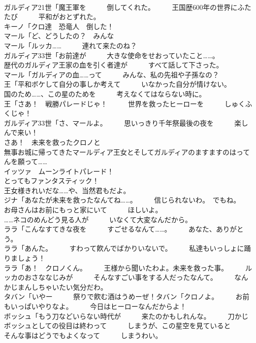 \documentclass[8pt]{extreport}
\begin{document}
\begin{CJK}{UTF8}{min}
\\	ガルディア21世「魔王軍を　　　倒してくれた。　　　王国歴600年の世界にふたたび　　　平和がおとずれた。	
\\	キーノ「クロ達　恐竜人　倒した！	
\\	マール「ど、どうしたの？　みんな	
\\	マール「ルッカ……　　　連れて来たのね？	
\\	ガルディア33世「お前達が　　　大きな使命をせおっていたこと……。	
\\	歴代のガルディア王家の血を引く者達が　　　すべて話して下さった。	
\\	マール「ガルディアの血……って　　　みんな、私の先祖や子孫なの？	
\\	王「平和ボケして自分の事しか考えて　　　いなかった自分が情けない。　　　国のため……、この星のためを　　　考えなくてはならない時に。	
\\	王「さあ！　戦勝パレードじゃ！　　　世界を救ったヒーローを　　　しゅくふくじゃ！	
\\	ガルディア33世「さ、マールよ。　　　思いっきり千年祭最後の夜を　　　楽しんで来い！	
\\	さあ！　未来を救ったクロノと	
\\	無事お城に帰ってきたマールディア王女とそしてガルディアのますますのはってんを願って……	
\\	イッツァ　ムーンライトパレード！	
\\	とってもファンタスティック！	
\\	王女様きれいだな……や、当然君もだよ。	
\\	ジナ「あなたが未来を救ったなんてね……。　　　信じられないわ。　でもね。　　　お母さんはお前にもっと家にいて　　　ほしいよ。	
\\	……ネコのめんどう見る人が　　　いなくて大変なんだから。	
\\	ララ「こんなすてきな夜を　　　すごせるなんて……。　　　あなた、ありがとう。	
\\	ララ「あんた。　　　すわって飮んでばかりいないで。　　　私達もいっしょに踊りましょう！	
\\	ララ「あ！　クロノくん。　　　王様から聞いたわよ。未来を救った事。　　　ルッカのおさななじみが　　　そんなすごい事をする人だったなんて。　　　なんかじまんしちゃいたい気分だわ。	
\\	タバン「いやー　　　祭りで飮む酒はうめーぜ！タバン「クロノよ。　　　お前もいっぱいやりなよ。　　　今日はヒーローなんだからよ！	
\\	ボッシュ「もう刀などいらない時代が　　　来たのかもしれんな。　　　刀かじボッシュとしての役目は終わって　　　しまうが、この星空を見ていると　　　そんな事はどうでもよくなって　　　しまうわい。	

\end{CJK}
\end{document}
